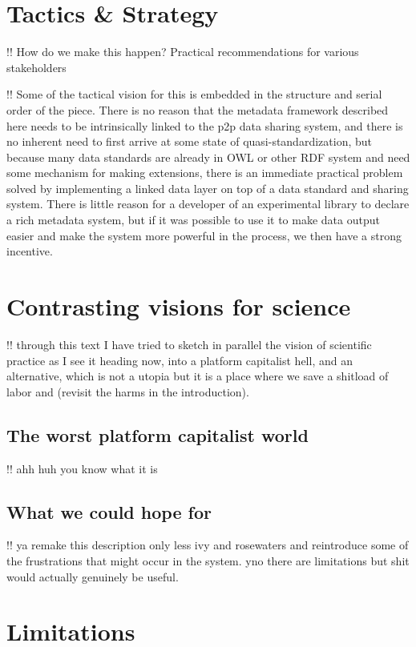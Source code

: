 \documentclass[notoc]{tufte-book}
\begin{document}
\section{Tactics \& Strategy}

!! How do we make this happen? Practical recommendations for various
stakeholders

!! Some of the tactical vision for this is embedded in the structure and
serial order of the piece. There is no reason that the metadata
framework described here needs to be intrinsically linked to the p2p
data sharing system, and there is no inherent need to first arrive at
some state of quasi-standardization, but because many data standards are
already in OWL or other RDF system and need some mechanism for making
extensions, there is an immediate practical problem solved by
implementing a linked data layer on top of a data standard and sharing
system. There is little reason for a developer of an experimental
library to declare a rich metadata system, but if it was possible to use
it to make data output easier and make the system more powerful in the
process, we then have a strong incentive.


\section{Contrasting visions for
science}

!! through this text I have tried to sketch in parallel the vision of
scientific practice as I see it heading now, into a platform capitalist
hell, and an alternative, which is not a utopia but it is a place where
we save a shitload of labor and (revisit the harms in the introduction).


\subsection{The worst platform capitalist
world}

!! ahh huh you know what it is


\subsection{What we could hope for}

!! ya remake this description only less ivy and rosewaters and
reintroduce some of the frustrations that might occur in the system. yno
there are limitations but shit would actually genuinely be useful.


\section{Limitations}
\end{document}
